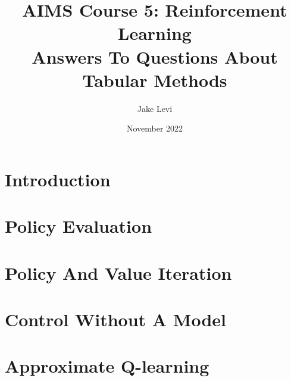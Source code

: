 \documentclass{article}
\title{
    AIMS Course 5: Reinforcement Learning \\
    \large Answers To Questions About Tabular Methods
}
\author{Jake Levi}
\date{November 2022}
\begin{document}
\maketitle
\section{Introduction} \label{section:intro}

\pagebreak
\section{Policy Evaluation}

\section{Policy And Value Iteration}

\section{Control Without A Model}

\pagebreak
\section{Approximate Q-learning}



\end{document}
